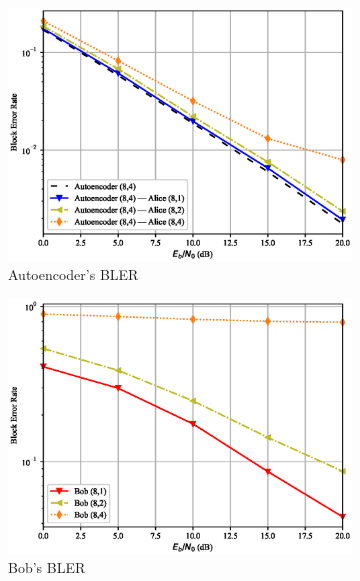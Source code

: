 \begin{figure}[th!]
	\begin{subfigure}{0.3\textwidth}
		\includegraphics[width=\linewidth]{figs/covert_autoencoder_bler_rayleigh}
		\caption{Autoencoder's BLER}
		\label{fig:rayleigh_resutls_ae}
	\end{subfigure}
	\hspace*{\fill}
	\begin{subfigure}{0.3\textwidth}
		\includegraphics[width=\linewidth]{figs/bob_bler_rayleigh}
		\caption{Bob's BLER}
		\label{fig:rayleigh_resutls_bob}	
	\end{subfigure}
	\hspace*{\fill}
	\begin{subfigure}{0.3\textwidth}

\end{subfigure}
\end{figure}
